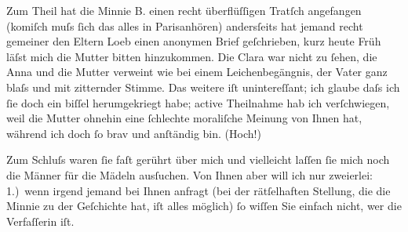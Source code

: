 \pstart
           Zum Theil hat die Minnie B. einen recht
               überflüſſigen Tratſch angefangen (komiſch muſs ſich das alles in Parisanhören) andersſeits hat jemand
               recht gemeiner den Eltern Loeb einen
               anonymen Brief geſchrieben, kurz heute Früh läſst mich die Mutter bitten hinzukommen. Die Clara war nicht zu ſehen, die Anna und die Mutter verweint wie bei einem Leichenbegängnis, der Vater ganz blaſs und mit
               zitternder Stimme. Das weitere iſt unintereſſant; ich glaube daſs ich ſie doch ein
               biſſel herumgekriegt {\pb}habe;  active Theilnahme hab ich verſchwiegen, weil die
                  Mutter ohnehin eine
               ſchlechte moraliſche Meinung von Ihnen hat, während ich doch ſo brav und anſtändig
               bin. (Hoch!)\pend
           
\pstart
           Zum Schluſs waren ſie faſt gerührt über mich und vielleicht laſſen ſie mich noch die Männer für die Mädeln ausſuchen. Von
               Ihnen aber will ich nur zweierlei: 1.) wenn irgend jemand bei Ihnen anfragt (bei der
               rätſelhaften Stellung, die {\pb}die
                  Minnie zu der Geſchichte hat, iſt alles
               möglich) ſo wiſſen Sie einfach nicht, wer die Verfaſſerin iſt.\pend
           
